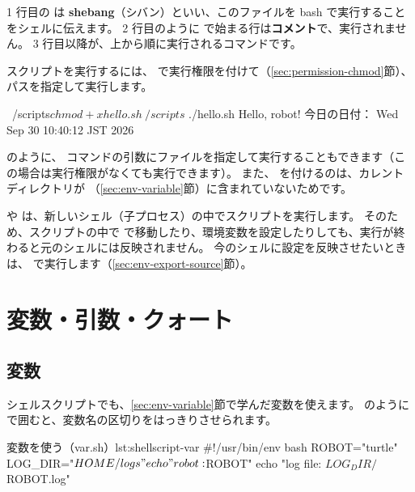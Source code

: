 1 行目の  は \textbf{shebang}（シバン）といい、このファイルを bash で実行することをシェルに伝えます。
2 行目のように \cmd{\#} で始まる行は\textbf{コメント}で、実行されません。
3 行目以降が、上から順に実行されるコマンドです。

スクリプトを実行するには、 で実行権限を付けて（\ref{sec:permission-chmod}節）、パスを指定して実行します。

\begin{terminal}[スクリプトを実行する]
~/scripts$ chmod +x hello.sh
~/scripts$ ./hello.sh
Hello, robot!
今日の日付：
Wed Sep 30 10:40:12 JST 2026
\end{terminal}

 のように、 コマンドの引数にファイルを指定して実行することもできます（この場合は実行権限がなくても実行できます）。
また、 を付けるのは、カレントディレクトリが （\ref{sec:env-variable}節）に含まれていないためです。

\begin{point}
   や  は、新しいシェル（子プロセス）の中でスクリプトを実行します。
  そのため、スクリプトの中で  で移動したり、環境変数を設定したりしても、実行が終わると元のシェルには反映されません。
  今のシェルに設定を反映させたいときは、 で実行します（\ref{sec:env-export-source}節）。
\end{point}

\section{変数・引数・クォート}
\label{sec:shellscript-variable}

\subsection{変数}

シェルスクリプトでも、\ref{sec:env-variable}節で学んだ変数を使えます。
 のように \cmd{\{ \}} で囲むと、変数名の区切りをはっきりさせられます。

\begin{codelisting}[style=bash]{変数を使う（var.sh）}{lst:shellscript-var}
#!/usr/bin/env bash
ROBOT="turtle"
LOG_DIR="$HOME/logs"
echo "robot: $ROBOT"
echo "log file: ${LOG_DIR}/${ROBOT}.log"
\end{codelisting}


